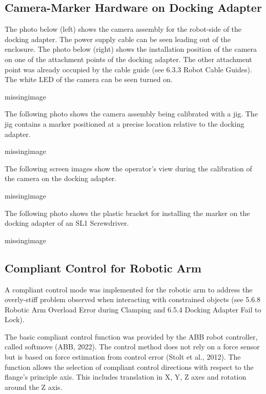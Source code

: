 \subsection{Camera-Marker Hardware on Docking Adapter}
\label{subsection:exploration_4_camera_marker_hardware_on_docking_adapter}

The photo below (left) shows the camera assembly for the robot-side of the docking adapter. The power supply cable can be seen leading out of the enclosure. The photo below (right) shows the installation position of the camera on one of the attachment points of the docking adapter. The other attachment point was already occupied by the cable guide (see 6.3.3 Robot Cable Guides). The white LED of the camera can be seen turned on.

missingimage

The following photo shows the camera assembly being calibrated with a jig. The jig contains a marker positioned at a precise location relative to the docking adapter.

missingimage

The following screen images show the operator’s view during the calibration of the camera on the docking adapter.

missingimage

The following photo shows the plastic bracket for installing the marker on the docking adapter of an SL1 Screwdriver. 

missingimage

\subsection{Compliant Control for Robotic Arm}
\label{subsection:exploration_4_compliant_control_for_robotic_arm}

A compliant control mode was implemented for the robotic arm to address the overly-stiff problem observed when interacting with constrained objects (see 5.6.8 Robotic Arm Overload Error during Clamping and 6.5.4 Docking Adapter Fail to Lock).

The basic compliant control function was provided by the ABB robot controller, called softmove (ABB, 2022). The control method does not rely on a force sensor but is based on force estimation from control error (Stolt et al., 2012). The function allows the selection of compliant control directions with respect to the flange’s principle axis. This includes translation in X, Y, Z axes and rotation around the Z axis. 

